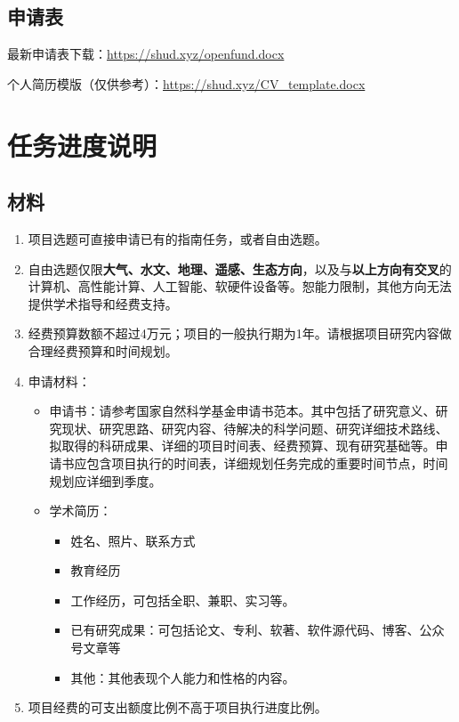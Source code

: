 \documentclass[
]{book}
\providecommand{\tightlist}{%
  \setlength{\itemsep}{0pt}\setlength{\parskip}{0pt}}
\begin{document}
\hypertarget{ux7533ux8bf7ux8868}{%
\section{申请表}\label{ux7533ux8bf7ux8868}}

最新申请表下载：\url{https://shud.xyz/openfund.docx}

个人简历模版（仅供参考）：\url{https://shud.xyz/CV_template.docx}

\hypertarget{ux4efbux52a1ux8fdbux5ea6ux8bf4ux660e}{%
\chapter{任务进度说明}\label{ux4efbux52a1ux8fdbux5ea6ux8bf4ux660e}}

\hypertarget{ux6750ux6599-1}{%
\section{材料}\label{ux6750ux6599-1}}

\begin{enumerate}
\def\labelenumi{\arabic{enumi}.}
\tightlist
\item
  项目选题可直接申请已有的指南任务，或者自由选题。
\item
  自由选题仅限\textbf{大气、水文、地理、遥感、生态方向}，以及与\textbf{以上方向有交叉}的计算机、高性能计算、人工智能、软硬件设备等。恕能力限制，其他方向无法提供学术指导和经费支持。
\item
  经费预算数额不超过4万元；项目的一般执行期为1年。请根据项目研究内容做合理经费预算和时间规划。
\item
  申请材料：

  \begin{itemize}
  \tightlist
  \item
    申请书：请参考国家自然科学基金申请书范本。其中包括了研究意义、研究现状、研究思路、研究内容、待解决的科学问题、研究详细技术路线、拟取得的科研成果、详细的项目时间表、经费预算、现有研究基础等。申请书应包含项目执行的时间表，详细规划任务完成的重要时间节点，时间规划应详细到季度。
  \item
    学术简历：

    \begin{itemize}
    \tightlist
    \item
      姓名、照片、联系方式
    \item
      教育经历
    \item
      工作经历，可包括全职、兼职、实习等。
    \item
      已有研究成果：可包括论文、专利、软著、软件源代码、博客、公众号文章等
    \item
      其他：其他表现个人能力和性格的内容。
    \end{itemize}
  \end{itemize}
\item
  项目经费的可支出额度比例不高于项目执行进度比例。
\end{enumerate}
\end{document}
